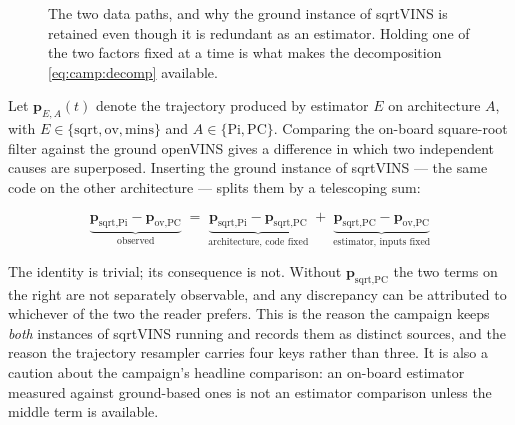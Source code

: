 \begin{figure}[htbp]
\caption{The two data paths, and why the ground instance of sqrtVINS is
retained even though it is redundant as an estimator. Holding one of the two
factors fixed at a time is what makes the decomposition
\eqref{eq:camp:decomp} available.}
\label{fig:camp:chemins}
\end{figure}

Let $\mathbf{p}_{E,A}(t)$ denote the trajectory produced by estimator $E$ on
architecture $A$, with $E \in \{\text{sqrt},\text{ov},\text{mins}\}$ and
$A \in \{\text{Pi},\text{PC}\}$. Comparing the on-board square-root filter
against the ground openVINS gives a difference in which two independent causes
are superposed. Inserting the ground instance of sqrtVINS --- the same code on
the other architecture --- splits them by a telescoping sum:

\begin{equation}
  \boxed{\;
  \underbrace{\mathbf{p}_{\text{sqrt},\text{Pi}} - \mathbf{p}_{\text{ov},\text{PC}}}
             _{\text{observed}}
  \;=\;
  \underbrace{\mathbf{p}_{\text{sqrt},\text{Pi}} - \mathbf{p}_{\text{sqrt},\text{PC}}}
             _{\text{architecture, code fixed}}
  \;+\;
  \underbrace{\mathbf{p}_{\text{sqrt},\text{PC}} - \mathbf{p}_{\text{ov},\text{PC}}}
             _{\text{estimator, inputs fixed}} \;}
  \label{eq:camp:decomp}
\end{equation}

The identity is trivial; its consequence is not. Without
$\mathbf{p}_{\text{sqrt},\text{PC}}$ the two terms on the right are not
separately observable, and any discrepancy can be attributed to whichever of
the two the reader prefers. This is the reason the campaign keeps
\emph{both} instances of sqrtVINS running and records them as distinct
sources, and the reason the trajectory resampler carries four keys rather than
three. It is also a caution about the campaign's headline comparison: an
on-board estimator measured against ground-based ones is not an
estimator comparison unless the middle term is available.

